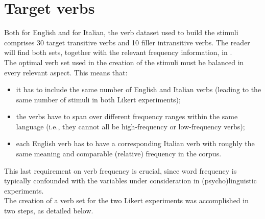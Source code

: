 \section{Target verbs} 
Both for English and for Italian, the verb dataset used to build the stimuli comprises 30 target transitive verbs and 10 filler intransitive verbs. The reader will find both sets, together with the relevant frequency information, in .\\
The optimal verb set used in the creation of the stimuli must be balanced in every relevant aspect. This means that:
\begin{itemize}
    \item it has to include the same number of English and Italian verbs (leading to the same number of stimuli in both Likert experiments);
    \item the verbs have to span over different frequency ranges within the same language (i.e., they cannot all be high-frequency or low-frequency verbs);
    \item each English verb has to have a corresponding Italian verb with roughly the same meaning and comparable (relative) frequency in the corpus.
\end{itemize}

This last requirement on verb frequency is crucial, since word frequency is typically confounded with the variables under consideration in (psycho)linguistic experiments.\\
The creation of a verb set for the two Likert experiments was accomplished in two steps, as detailed below.


